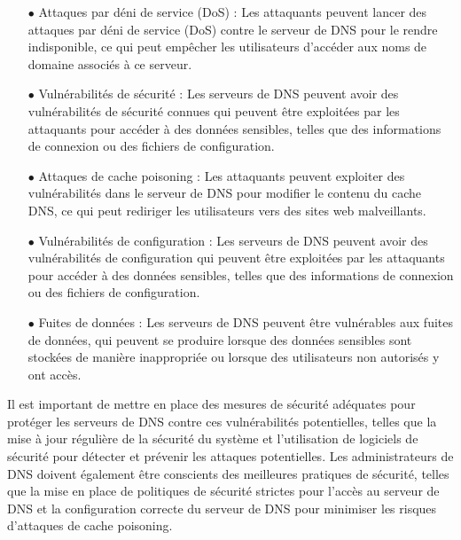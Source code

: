\begin{enumerate}
	\item[$\bullet$] Attaques par déni de service (DoS) : Les attaquants peuvent lancer des attaques par déni de service (DoS) contre le serveur de DNS pour le rendre indisponible, ce qui peut empêcher les utilisateurs d'accéder aux noms de domaine associés à ce serveur.
	
	 \item[$\bullet$] Vulnérabilités de sécurité : Les serveurs de DNS peuvent avoir des vulnérabilités de sécurité connues qui peuvent être exploitées par les attaquants pour accéder à des données sensibles, telles que des informations de connexion ou des fichiers de configuration.
	
\item[$\bullet$]  Attaques de cache poisoning : Les attaquants peuvent exploiter des vulnérabilités dans le serveur de DNS pour modifier le contenu du cache DNS, ce qui peut rediriger les utilisateurs vers des sites web malveillants.
	
	\item[$\bullet$]  Vulnérabilités de configuration : Les serveurs de DNS peuvent avoir des vulnérabilités de configuration qui peuvent être exploitées par les attaquants pour accéder à des données sensibles, telles que des informations de connexion ou des fichiers de configuration.
	
\item[$\bullet$] Fuites de données : Les serveurs de DNS peuvent être vulnérables aux fuites de données, qui peuvent se produire lorsque des données sensibles sont stockées de manière inappropriée ou lorsque des utilisateurs non autorisés y ont accès.
	
\end{enumerate}

Il est important de mettre en place des mesures de sécurité adéquates pour protéger les serveurs de DNS contre ces vulnérabilités potentielles, telles que la mise à jour régulière de la sécurité du système et l'utilisation de logiciels de sécurité pour détecter et prévenir les attaques potentielles. Les administrateurs de DNS doivent également être conscients des meilleures pratiques de sécurité, telles que la mise en place de politiques de sécurité strictes pour l'accès au serveur de DNS et la configuration correcte du serveur de DNS pour minimiser les risques d'attaques de cache poisoning.
 
